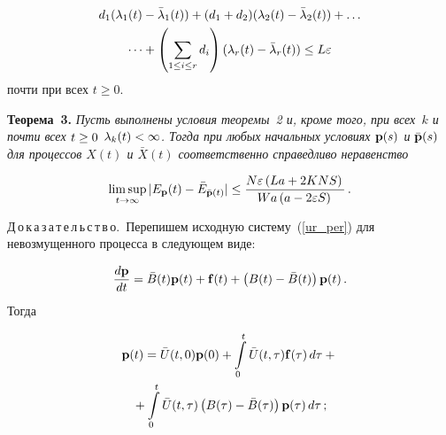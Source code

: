 \begin{multicols}{2}
\noindent
\begin{multline*}
d_1(\lambda_1(t)-\bar{\lambda}_1(t)) + (d_1+d_2)(\lambda_2(t)-\bar{\lambda}_2(t)) + \dots\\
\dots + 
\left(\sum\limits_{1 \le i \le r}d_i\right) (\lambda_r(t)-\bar{\lambda}_r(t)) \le 
L\varepsilon
\end{multline*} 
почти при всех $t \ge 0.$

\smallskip

\noindent
\textbf{Теорема~3.}
\textit{Пусть  выполнены условия теоремы~2 и, кроме того, при всех~$k$ 
и почти всех $t \hm\ge 0$ $\la_k(t) \hm< \infty$. Тогда при любых начальных условиях 
${\bf p}(s)$ и ${\bar{\bf p}}(s)$ для процессов $X(t)$ и $\bar{X}(t)$ 
соответственно справедливо неравенство}

\noindent
\begin{equation*}
\limsup\limits_{t \to \infty}   |E_{\bf p}(t)- \bar{E}_{\bar{\bf p}(t)}|\le 
\displaystyle\frac{\displaystyle  N\varepsilon\left(L a+ 2KNS\right)\mathstrut}{\displaystyle W a \left(a-2\varepsilon S\right)\mathstrut}\,.
\end{equation*}


\smallskip

\noindent
Д\,о\,к\,а\,з\,а\,т\,е\,л\,ь\,с\,т\,в\,о.\
 Перепишем исходную систему~(\ref{ur_per}) для невозмущенного процесса в следующем виде:
 \noindent
 
\begin{equation*}
\displaystyle\frac{\displaystyle d{\mathbf p}\mathstrut}{\displaystyle dt\mathstrut}=\bar{B}(t){\mathbf p}(t) + {\bf f}(t)+\left(B(t)-\bar{B}(t)\right){\mathbf p}(t)\,.
\end{equation*}
Тогда

\noindent
\begin{multline*}
{\mathbf p}(t)=\bar{U}(t,0){\mathbf p}(0)+\int\limits_0^t \bar{U}(t,\tau){\bf{f}}(\tau) \, d\tau+{}\\
{}+\int\limits_0^t \bar{U}(t,\tau) \left(B(\tau)-\bar{B}(\tau)\right){\mathbf p}(\tau)\, d\tau\,;
\end{multline*}

\vspace*{-9pt}


\end{multicols}
